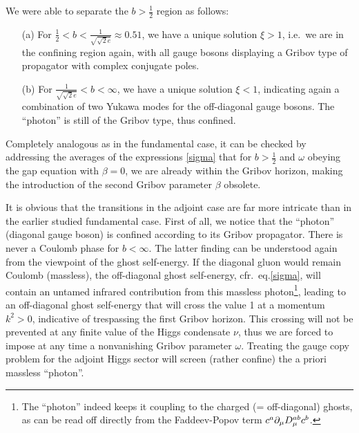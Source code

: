 We were able to separate the $b>\frac{1}{2}$ region as follows:
\begin{itemize}
\item[(a)] For $\frac{1}{2}<b<\frac{1}{\sqrt{\sqrt{2}e}}\approx 0.51$, we have a unique solution $\xi>1$, i.e.~we are in the confining region again, with all gauge bosons displaying a Gribov type of propagator with complex conjugate poles.
\item[(b)] For $\frac{1}{\sqrt{\sqrt{2}e}}< b<\infty$, we have a unique solution $\xi<1$, indicating again a combination of two Yukawa modes for the off-diagonal gauge bosons. The ``photon'' is still of the Gribov type, thus confined.
\end{itemize}
Completely analogous as in the fundamental case, it can be checked by addressing the averages of the expressions \eqref{sigma} that for $b>\frac{1}{2}$ and $\omega$ obeying the gap equation with $\beta=0$, we are already within the Gribov horizon, making the introduction of the second Gribov parameter $\beta$ obsolete.

It is obvious that the transitions in the adjoint case are far more intricate than in the earlier studied fundamental case. First of all, we notice that the ``photon'' (diagonal gauge boson) is confined according to its Gribov propagator. There is never a Coulomb phase for $b<\infty$. The latter finding can be understood again from the viewpoint of the ghost self-energy. If the diagonal gluon would remain Coulomb (massless), the off-diagonal ghost self-energy, cfr.~eq.\eqref{sigma}, will contain an untamed infrared contribution from this massless photon\footnote{The ``photon'' indeed keeps it coupling to the charged (= off-diagonal) ghosts, as can be read off directly from the Faddeev-Popov term $c^a \partial_\mu D_\mu^{ab}c^b$.}, leading to an off-diagonal ghost self-energy that will cross the value 1 at a momentum $k^2>0$, indicative of trespassing the first Gribov horizon. This crossing will not be prevented at any finite value of the Higgs condensate $\nu$, thus we are forced to impose at any time a nonvanishing Gribov parameter $\omega$. Treating the gauge copy problem for the adjoint Higgs sector will screen (rather confine) the a priori massless ``photon''.

